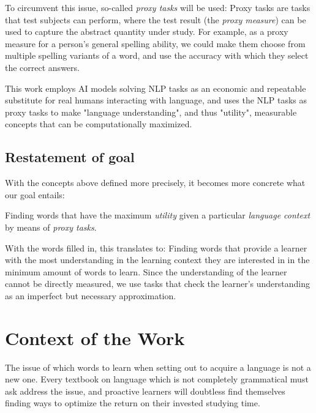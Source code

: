To circumvent this issue, so-called \textit{proxy tasks} will be used:
Proxy tasks are tasks that test subjects can perform, where the test result (the \textit{proxy measure}) can be used to capture the abstract quantity under study.
For example, as a proxy measure for a person's general spelling ability, we could make them choose from multiple spelling variants of a word, and use the accuracy with which they select the correct answers.

This work employs AI models solving NLP tasks as an economic and repeatable substitute for real humans interacting with language, and uses the NLP tasks as proxy tasks to make "language understanding", and thus "utility", measurable concepts that can be computationally maximized.

\subsection{Restatement of goal}
With the concepts above defined more precisely, it becomes more concrete what our goal entails:

Finding words that have the maximum \textit{utility} given a particular \textit{language context} by means of \textit{proxy tasks}.

With the words filled in, this translates to:
Finding words that provide a learner with the most understanding in the learning context they are interested in in the minimum amount of words to learn.
Since the understanding of the learner cannot be directly measured, we use tasks that check the learner's understanding as an imperfect but necessary approximation.



\section{Context of the Work} \label{sec:context-of-work}

The issue of which words to learn when setting out to acquire a language is not a new one.
Every textbook on language which is not completely grammatical must ask address the issue, and proactive learners will doubtless find themselves finding ways to optimize the return on their invested studying time.

